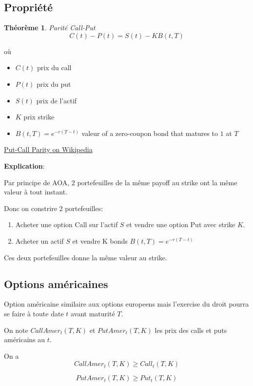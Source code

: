 \documentclass{article}
\theoremstyle{plain}
\newtheorem{thm}{Th\'eor\`eme}[section]
\theoremstyle{definition}
\begin{document}
\subsection{Propri\'et\'e}
\begin{thm}
	Parit\'e Call-Put
	\begin{equation}
		C(t) - P(t) = S(t)-KB(t,T)
	\end{equation}
\end{thm}
o\`u
\begin{itemize}
	\item $C(t)$ prix du call
	\item $P(t)$ prix du put
	\item $S(t)$ prix de l'actif
	\item $K$ prix strike
	\item $B(t,T)=e^{-r(T-t)}$ valeur of a zero-coupon bond that matures to $1$ at  $T$
\end{itemize}
{\color{blue} \href{https://en.wikipedia.org/wiki/Put%E2%80%93call_parity}{Put-Call Parity on Wikipedia}}

\textbf{Explication}:

Par principe de AOA, $2$ portefeuilles de la m\^eme payoff au strike ont la m\^eme valeur \`a tout instant.

Donc on constrire 2 portefeuilles:
\begin{enumerate}
	\item Acheter une option Call sur l'actif $S$ et vendre une option Put avec strike $K$.
	\item Acheter un actif $S$ et vendre K bonds $B(t,T)=e^{-r(T-t)}$
\end{enumerate}
Ces deux portefeuilles donne la m\^eme valeur au strike. 
	
\subsection{Options am\'ericaines}
Option am\'ericaine similaire aux options europeens mais l'exercise du droit pourra se faire \`a toute date $t$ avant maturit\'e $T$.

On note $CallAmer_t(T, K)$ et $PutAmer_t(T, K)$ les prix des calls et puts am\'ericains au $t$.

On a 
\begin{equation}
CallAmer_t(T,K) \geq Call_t(T, K)
\end{equation}
 
\begin{equation}
PutAmer_t(T, K) \geq Put_t(T, K)
\end{equation}
\end{document}
